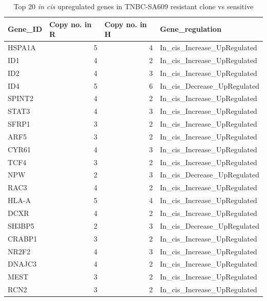  \begin{table}[htbp]
   \centering
   \caption{Top 20 \textit{in cis} upregulated genes in TNBC-SA609 resistant clone vs sensitive}
     
     \begin{tabular}{|l|r|r|l|}
     \hline
     \textbf{Gene\_ID} & \multicolumn{1}{|l|}{ \textbf{Copy no. in R}}& \multicolumn{1}{|l|}{ \textbf{Copy no. in H}} &  \textbf{Gene\_regulation} \\
     \hline
     HSPA1A & 5 & 4 & In\_cis\_Increase\_UpRegulated \\
     ID1 & 4 & 2 & In\_cis\_Increase\_UpRegulated \\
     ID2 & 4 & 3 & In\_cis\_Increase\_UpRegulated \\
     ID4 & 5 & 6 & In\_cis\_Decrease\_UpRegulated \\
     SPINT2 & 4 & 2 & In\_cis\_Increase\_UpRegulated \\
     STAT3 & 4 & 3 & In\_cis\_Increase\_UpRegulated \\
     SFRP1 & 3 & 2 & In\_cis\_Increase\_UpRegulated \\
     ARF5 & 3 & 2 & In\_cis\_Increase\_UpRegulated \\
     CYR61 & 4 & 3 & In\_cis\_Increase\_UpRegulated \\
     TCF4 & 3 & 2 & In\_cis\_Increase\_UpRegulated \\
     NPW & 2 & 3 & In\_cis\_Decrease\_UpRegulated \\
     RAC3 & 4 & 2 & In\_cis\_Increase\_UpRegulated \\
     HLA-A & 5 & 4 & In\_cis\_Increase\_UpRegulated \\
     DCXR & 4 & 2 & In\_cis\_Increase\_UpRegulated \\
     SH3BP5 & 2 & 3 & In\_cis\_Decrease\_UpRegulated \\
     CRABP1 & 3 & 2 & In\_cis\_Increase\_UpRegulated \\
     NR2F2 & 4 & 3 & In\_cis\_Increase\_UpRegulated \\
     DNAJC3 & 4 & 2 & In\_cis\_Increase\_UpRegulated \\
     MEST & 3 & 2 & In\_cis\_Increase\_UpRegulated \\
     RCN2 & 3 & 2 & In\_cis\_Increase\_UpRegulated \\
     
    \hline
     \end{tabular}%
  
   \label{tab:top20SA609upregulated}%
 \end{table}%

